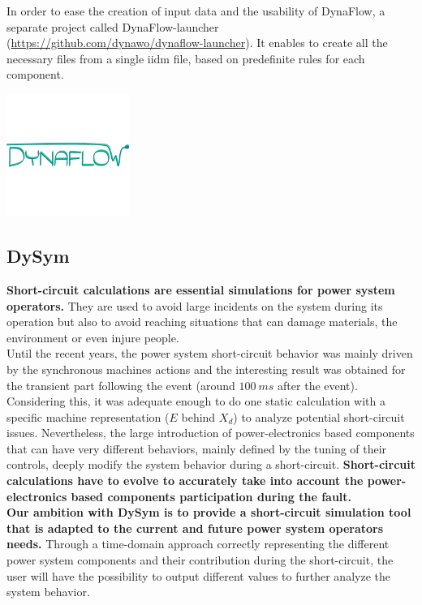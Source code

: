 \documentclass[a4paper, 12pt]{report}
\begin{document}
In order to ease the creation of input data and the usability of DynaFlow, a separate project called DynaFlow-launcher (\url{https://github.com/dynawo/dynaflow-launcher}). It enables to create all the necessary files from a single iidm file, based on predefinite rules for each component.

\begin{center}
\includegraphics[width=0.3\textwidth]{../resources/DynaFlow.png}
\end{center}

\newpage
\subsection{DySym}

\textbf{Short-circuit calculations are essential simulations for power system operators.} They are used to avoid large incidents on the system during its operation but also to avoid reaching situations that can damage materials, the environment or even injure people. \\

Until the recent years, the power system short-circuit behavior was mainly driven by the synchronous machines actions and the interesting result was obtained for the transient part following the event (around $100 \ ms$ after the event). Considering this, it was adequate enough to do one static calculation with a specific machine representation ($E$ behind $X_{d}$) to analyze potential short-circuit issues. Nevertheless, the large introduction of power-electronics based components that can have very different behaviors, mainly defined by the tuning of their controls, deeply modify the system behavior during a short-circuit. \textbf{Short-circuit calculations have to evolve to accurately take into account the power-electronics based components participation during the fault.} \\

\textbf{Our ambition with DySym is to provide a short-circuit simulation tool that is adapted to the current and future power system operators needs.} Through a time-domain approach correctly representing the different power system components and their contribution during the short-circuit, the user will have the possibility to output different values to further analyze the system behavior. \\
\end{document}
